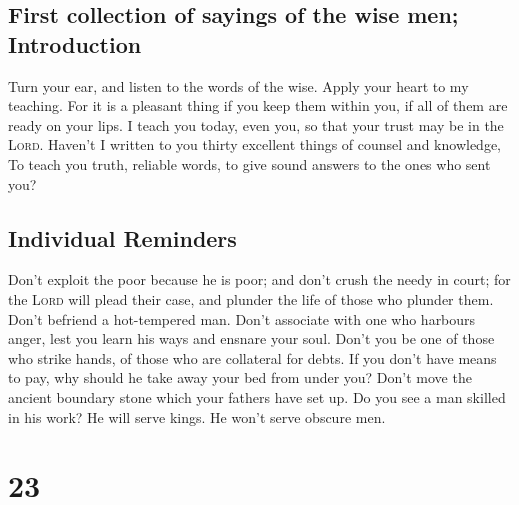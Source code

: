 \hypertarget{first-collection-of-sayings-of-the-wise-men-introduction}{%
\subsection{First collection of sayings of the wise men;
Introduction}\label{first-collection-of-sayings-of-the-wise-men-introduction}}

 Turn your ear, and listen to the words of the wise.
Apply your heart to my teaching.  For it is a pleasant
thing if you keep them within you, if all of them are ready on your
lips.  I teach you today, even you, so that your trust
may be in the \textsc{Lord}.  Haven't I written to you
thirty excellent things of counsel and knowledge,  To
teach you truth, reliable words, to give sound answers to the ones who
sent you?

\hypertarget{individual-reminders}{%
\subsection{Individual Reminders}\label{individual-reminders}}

 Don't exploit the poor because he is poor; and don't
crush the needy in court;  for the \textsc{Lord} will
plead their case, and plunder the life of those who plunder them.
 Don't befriend a hot-tempered man. Don't associate with
one who harbours anger,  lest you learn his ways and
ensnare your soul.  Don't you be one of those who strike
hands, of those who are collateral for debts.  If you
don't have means to pay, why should he take away your bed from under
you?  Don't move the ancient boundary stone which your
fathers have set up.  Do you see a man skilled in his
work? He will serve kings. He won't serve obscure men.

\hypertarget{section-22}{%
\section{23}\label{section-22}}

